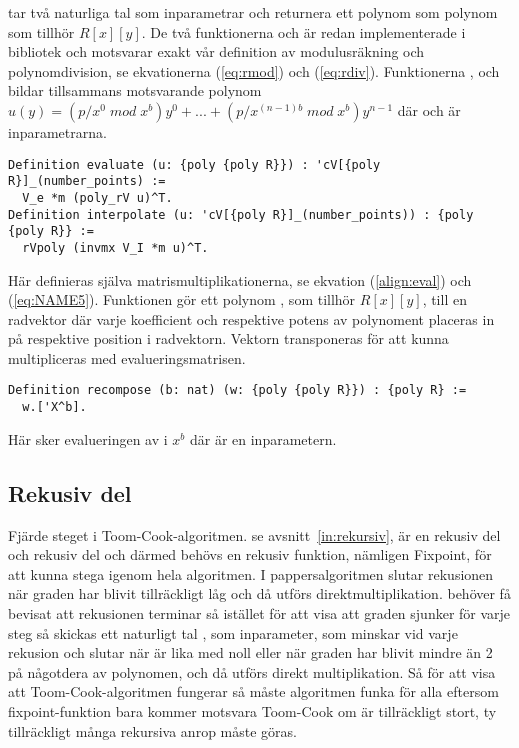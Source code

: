  tar två naturliga tal som inparametrar och returnera ett polynom som
polynom som tillhör $R[x][y]$. De två funktionerna  och  är
redan implementerade i \ssr bibliotek och motsvarar exakt vår definition av
modulusräkning och polynomdivision, se ekvationerna (\ref{eq:rmod}) och
(\ref{eq:rdiv}). Funktionerna ,  och  bildar
tillsammans motsvarande polynom
$u(y)=(p/x^0\;mod\;x^b)y^0+...+(p/x^{(n-1)b}\;mod\;x^b)y^{n-1}$ där  och
 är inparametrarna.

\begin{lstlisting}
Definition evaluate (u: {poly {poly R}}) : 'cV[{poly R}]_(number_points) :=
  V_e *m (poly_rV u)^T.
Definition interpolate (u: 'cV[{poly R}]_(number_points)) : {poly {poly R}} :=
  rVpoly (invmx V_I *m u)^T.
\end{lstlisting}

Här definieras själva matrismultiplikationerna, se ekvation (\ref{align:eval})
och (\ref{eq:NAME5}). Funktionen  gör ett polynom , som
tillhör $R[x][y]$, till en radvektor där varje koefficient och respektive
potens av polynoment placeras in på respektive position i radvektorn. Vektorn
transponeras för att kunna multipliceras med evalueringsmatrisen.

\begin{lstlisting}
Definition recompose (b: nat) (w: {poly {poly R}}) : {poly R} :=
  w.['X^b].
\end{lstlisting}

Här sker evalueringen av  i $x^b$ där  är en inparametern.

\subsection{Rekusiv del}

Fjärde steget i Toom-Cook-algoritmen. se avsnitt~\ref{in:rekursiv},  är en rekusiv del och
rekusiv del och därmed behövs en rekusiv funktion, nämligen Fixpoint, för att
kunna stega igenom hela algoritmen. I pappersalgoritmen slutar rekusionen när
graden har blivit tillräckligt låg och då utförs direktmultiplikation. \coq
behöver få bevisat att rekusionen terminar så istället för att visa att graden
sjunker för varje steg så skickas ett naturligt tal , som inparameter, som
minskar vid varje rekusion och slutar när  är lika med noll eller när
graden har blivit mindre än 2 på någotdera av polynomen, och då utförs direkt
multiplikation. Så för att visa att Toom-Cook-algoritmen fungerar så måste
algoritmen funka för alla  eftersom fixpoint-funktion bara kommer motsvara
Toom-Cook om  är tillräckligt stort, ty tillräckligt många rekursiva anrop
måste göras.

